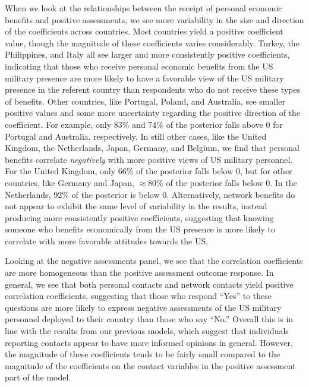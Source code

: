 When we look at the relationships between the receipt of personal economic benefits and positive assessments, we see more variability in the size and direction of the coefficients across countries. Most countries yield a positive coefficient value, though the magnitude of these coefficients varies considerably. Turkey, the Philippines, and Italy all see larger and more consistently positive coefficients, indicating that those who receive personal economic benefits from the US military presence are more likely to have a favorable view of the US military presence in the referent country than respondents who do not receive these types of benefits. Other countries, like Portugal, Poland, and Australia, see smaller positive values and some more uncertainty regarding the positive direction of the coefficient. For example, only 83\% and 74\% of the posterior falls above 0 for Portugal and Australia, respectively. In still other cases, like the United Kingdom, the Netherlands, Japan, Germany, and Belgium, we find that personal benefits correlate \textit{negatively} with more positive views of US military personnel. For the United Kingdom, only 66\% of the posterior falls below 0, but for other countries, like Germany and Japan, $\approx$80\% of the posterior falls below 0. In the Netherlands, 92\% of the posterior is below 0. Alternatively, network benefits do not appear to exhibit the same level of variability in the results, instead producing more consistently positive coefficients, suggesting that knowing someone who benefits economically  from the US presence is more likely to correlate with more favorable attitudes towards the US. 

Looking at the negative assessments panel, we see that the correlation coefficients are more homogeneous than the positive assessment outcome response. In general, we see that both personal contacts and network contacts yield positive correlation coefficients, suggesting that those who respond ``Yes'' to these questions are more likely to express negative assessments of the US military personnel deployed to their country than those who say ``No.'' Overall this is in line with the results from our previous models, which suggest that individuals reporting contacts appear to have more informed opinions in general. However, the magnitude of these coefficients tends to be fairly small compared to the magnitude of the coefficients on the contact variables in the positive assessment part of the model.

